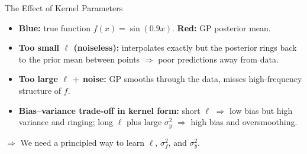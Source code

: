 \documentclass[aspectratio=169,11pt]{beamer}
\begin{document}
\begin{frame}{The Effect of Kernel Parameters}
\vspace{0.2cm}
\begin{itemize}
  \item \textcolor{uzhblue}{\textbf{Blue:}} true function $f(x) = \sin(0.9x)$. \textcolor{harvardcrimson}{\textbf{Red:}} GP posterior mean.
  \item \textbf{Too small $\ell$ (noiseless):} interpolates exactly but the posterior rings back to the prior mean between points $\Rightarrow$ poor predictions away from data.
  \item \textbf{Too large $\ell$ + noise:} GP smooths through the data, misses high-frequency structure of $f$.
  \item \textbf{Bias--variance trade-off in kernel form:} short $\ell$ $\Rightarrow$ low bias but high variance and ringing; long $\ell$ plus large $\sigma_y^2$ $\Rightarrow$ high bias and oversmoothing.
\end{itemize}

$\Rightarrow$ We need a principled way to learn $\ell$, $\sigma_f^2$, and $\sigma_y^2$.
\end{frame}
\end{document}
